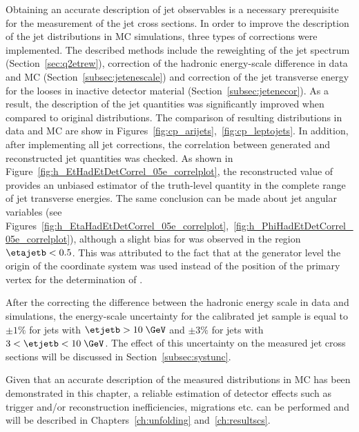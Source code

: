%
Obtaining an accurate description of jet observables is a necessary prerequisite for the measurement of the jet cross sections. In order to improve the description of the jet distributions in MC simulations, three types of corrections were implemented. The described methods include the reweighting of the jet spectrum (Section~\ref{sec:q2etrew}), correction of the hadronic energy-scale difference in data and MC (Section~\ref{subsec:jetenescale}) and correction of the jet transverse energy for the looses in inactive detector material (Section~\ref{subsec:jetenecor}). As a result, the description of the jet quantities was significantly improved when compared to original distributions. The comparison of resulting distributions in data and MC are show in Figures~\ref{fig:cp_arijets},~\ref{fig:cp_leptojets}. In addition, after implementing all jet corrections, the correlation between generated and reconstructed jet quantities was checked. As shown in Figure~\ref{fig:h_EtHadEtDetCorrel_05e_correlplot}, the reconstructed value of \etjetb provides an unbiased estimator of the truth-level quantity in the complete range of jet transverse energies. The same conclusion can be made about jet angular variables (see Figures~\ref{fig:h_EtaHadEtDetCorrel_05e_correlplot},~\ref{fig:h_PhiHadEtDetCorrel_05e_correlplot}), although a slight bias for \etajetb was observed in the region $\etajetb < 0.5$. This was attributed to the fact that at the generator level the origin of the \zeus coordinate system was used instead of the position of the primary vertex for the determination of \etajetb.

After the correcting the difference between the hadronic energy scale in data and simulations, the energy-scale uncertainty for the calibrated jet sample is equal to $\pm 1\%$ for jets with $\etjetb > 10\;\GeV$  and $\pm 3\%$ for jets with $3 < \etjetb < 10\;\GeV$. The effect of this uncertainty on the measured jet cross sections will be discussed in Section~\ref{subsec:systunc}.

Given that an accurate description of the measured distributions in MC has been demonstrated in this chapter, a reliable estimation of detector effects such as trigger and/or reconstruction inefficiencies, migrations etc. can be performed and will be described in Chapters~\ref{ch:unfolding} and~\ref{ch:resultscs}.